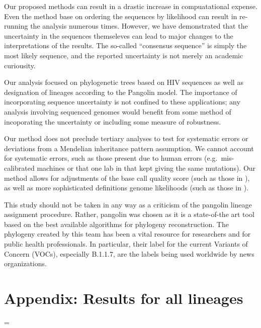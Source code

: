 \documentclass[
]{article}
\begin{document}
Our proposed methods can result in a drastic increase in compuatational
expense. Even the method base on ordering the sequences by likelihood
can result in re-running the analysis numerous times. However, we have
demonstrated that the uncertainty in the sequences themseleves can lead
to major changes to the interpretations of the results. The so-called
``consensus sequence'' is simply the most likely sequence, and the
reported uncertainty is not merely an academic curiousity.

Our analysis focused on phylogenetic trees based on HIV sequences as
well as designation of lineages according to the Pangolin model. The
importance of incorporating sequence uncertainty is not confined to
these applications; any analysis involving sequenced genomes would
benefit from some method of incoporating the uncertainty or including
some measure of robustness.

Our method does not preclude tertiary analyses to test for systematic
errors or deviations from a Mendelian inheritance pattern assumption. We
cannot account for systematic errors, such as those present due to human
errors (e.g.~mis-calibrated machines or that one lab in \citet{blank}
that kept giving the same mutations). Our method allows for adjustments
of the base call quality score (such as those in \citet{blank}), as well
as more sophisticated definitions genome likelihoods (such as those in
\citet{blank2}).

This study should not be taken in any way as a criticism of the pangolin
lineage assignment procedure. Rather, pangolin was chosen as it is a
state-of-the art tool based on the best available algorithms for
phylogeny reconstruction. The phylogeny created by this team has been a
vital resource for researchers and for public health professionals. In
particular, their label for the current Variants of Concern (VOCs),
especially B.1.1.7, are the labels being used worldwide by news
organizations.

\hypertarget{appendix-results-for-all-lineages}{%
\section{Appendix: Results for all
lineages}\label{appendix-results-for-all-lineages}}

\LTcapwidth=\textwidth

\scriptsize
\end{document}
